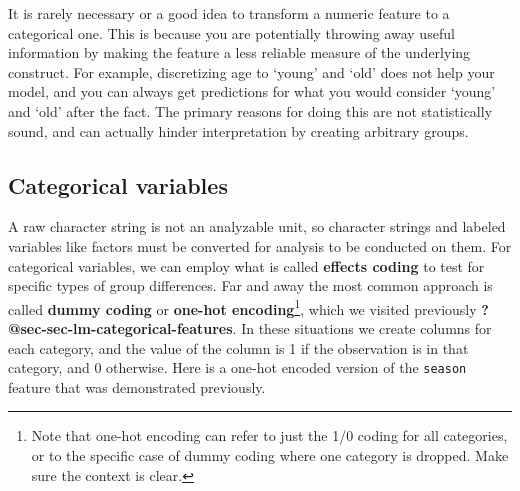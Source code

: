 \documentclass[
  letterpaper,
]{krantz}
\begin{document}
\begin{tcolorbox}[enhanced jigsaw, colframe=quarto-callout-tip-color-frame, opacityback=0, breakable, left=2mm, rightrule=.15mm, toprule=.15mm, arc=.35mm, leftrule=.75mm, colback=white, bottomrule=.15mm]

It is rarely necessary or a good idea to transform a numeric feature to
a categorical one. This is because you are potentially throwing away
useful information by making the feature a less reliable measure of the
underlying construct. For example, discretizing age to `young' and `old'
does not help your model, and you can always get predictions for what
you would consider `young' and `old' after the fact. The primary reasons
for doing this are not statistically sound, and can actually hinder
interpretation by creating arbitrary groups.

\end{tcolorbox}

\subsection{Categorical variables}\label{sec-data-cat}

A raw character string is not an analyzable unit, so character strings
and labeled variables like factors must be converted for analysis to be
conducted on them. For categorical variables, we can employ what is
called \textbf{effects coding} to test for specific types of group
differences. Far and away the most common approach is called
\textbf{dummy coding} or \textbf{one-hot encoding}\footnote{Note that
  one-hot encoding can refer to just the 1/0 coding for all categories,
  or to the specific case of dummy coding where one category is dropped.
  Make sure the context is clear.}, which we visited previously
\textbf{?@sec-sec-lm-categorical-features}. In these situations we
create columns for each category, and the value of the column is 1 if
the observation is in that category, and 0 otherwise. Here is a one-hot
encoded version of the \texttt{season} feature that was demonstrated
previously.
\end{document}
